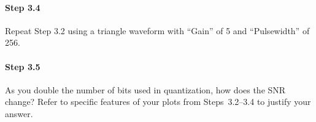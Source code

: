 \paragraph{Step 3.4} Repeat Step 3.2 using a triangle waveform with ``Gain'' of 5 and 
	``Pulsewidth'' of 256. 

\paragraph{Step 3.5} As you double the number of bits used in quantization, how does the SNR 
	change? Refer to specific features of your plots from Steps~3.2--3.4 to justify your answer. 
	

